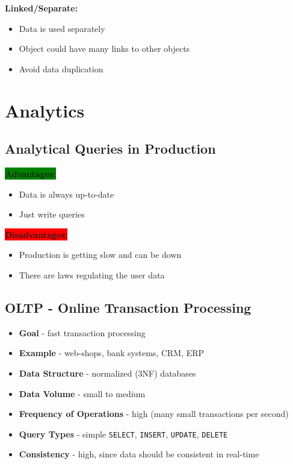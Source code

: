 \documentclass{article}
\newcommand{\code}[1]{\colorbox{light-gray}{\texttt{#1}}}
\begin{document}
\textbf{Linked/Separate:}

\begin{itemize}
  \item Data is used separately
  \item Object could have many links to other objects
  \item Avoid data duplication
\end{itemize}

\section{Analytics}
\noindent

\subsection{Analytical Queries in Production}
\noindent

\colorbox{green}{\textbf{Advantages:}}

\begin{itemize}
  \item Data is always up-to-date
  \item Just write queries
\end{itemize}

\colorbox{red}{\textbf{Disadvantages:}}

\begin{itemize}
  \item Production is getting slow and can be down
  \item There are laws regulating the user data
\end{itemize}

\subsection{OLTP - Online Transaction Processing}
\noindent

\begin{itemize}
  \item \textbf{Goal} - fast transaction processing 
  \item \textbf{Example} - web-shops, bank systems, CRM, ERP
  \item \textbf{Data Structure} - normalized (3NF) databases 
  \item \textbf{Data Volume} - small to medium
  \item \textbf{Frequency of Operations} - high (many small transactions per second)
  \item \textbf{Query Types} - simple \code{SELECT}, \code{INSERT}, \code{UPDATE}, \code{DELETE} 
  \item \textbf{Consistency} - high, since data should be consistent in real-time
\end{itemize}
\end{document}
